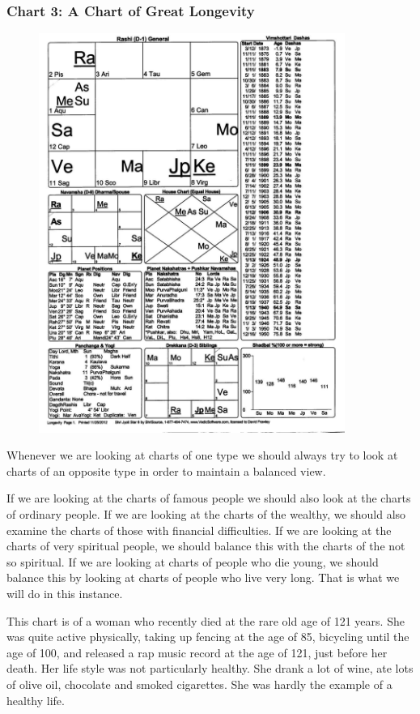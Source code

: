  

\subsubsection{Chart 3:
A Chart of Great Longevity}


\begin{figure}[h]
\centering
\includegraphics[width=10cm]{pics/Lesson6chart3.jpg}
\caption{}
\end{figure}


Whenever we are looking at charts of one type we should always try to look at charts of an opposite type in order to maintain a balanced view.

 

If we are looking at the charts of famous people we should also look at the charts of ordinary people. If we are looking at the charts of the wealthy, we should also examine the charts of those with financial difficulties. If we are looking at the charts of very spiritual people, we should balance this with the charts of the not so spiritual. If we are looking at charts of people who die young, we should balance this by looking at charts of people who live very long. That is what we will do in this instance.

 

This chart is of a woman who recently died at the rare old age of 121 years. She was quite active physically, taking up fencing at the age of 85, bicycling until the age of 100, and released a rap music record at the age of 121, just before her death. Her life style was not particularly healthy. She drank a lot of wine, ate lots of olive oil, chocolate and smoked cigarettes. She was hardly the example of a healthy life.

